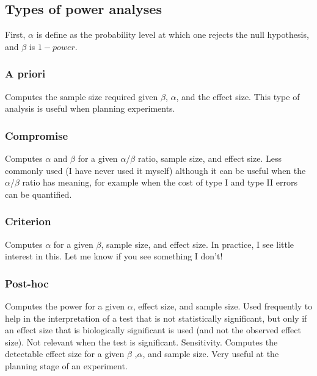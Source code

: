 \documentclass[
  12pt,
]{book}
\begin{document}
\hypertarget{types-of-power-analyses}{%
\subsection{Types of power analyses}\label{types-of-power-analyses}}

First, \(\alpha\) is define as the probability level at which
one rejects the null hypothesis, and \(\beta\) is \(1 - power\).

\hypertarget{a-priori}{%
\subsubsection*{A priori}\label{a-priori}}

Computes the sample size required given \(\beta\), \(\alpha\), and the effect size. This type of analysis is useful when planning experiments.

\hypertarget{compromise}{%
\subsubsection*{Compromise}\label{compromise}}

Computes \(\alpha\) and \(\beta\) for a given \(\alpha\)/\(\beta\) ratio, sample size, and effect size. Less commonly used (I have never used it myself) although it can be useful when the \(\alpha\)/\(\beta\) ratio has meaning, for example when the cost of type I and type II errors can be quantified.

\hypertarget{criterion}{%
\subsubsection*{Criterion}\label{criterion}}

Computes \(\alpha\) for a given \(\beta\), sample size, and effect size. In practice, I see little interest in this. Let me know if you see something I don't!

\hypertarget{post-hoc}{%
\subsubsection*{Post-hoc}\label{post-hoc}}

Computes the power for a given \(\alpha\), effect size, and
sample size. Used frequently to help in the interpretation of a test
that is not statistically significant, but only if an effect size that is
biologically significant is used (and not the observed effect size). Not
relevant when the test is significant.
Sensitivity. Computes the detectable effect size for a given \(\beta\) ,\(\alpha\), and
sample size. Very useful at the planning stage of an experiment.
\end{document}
